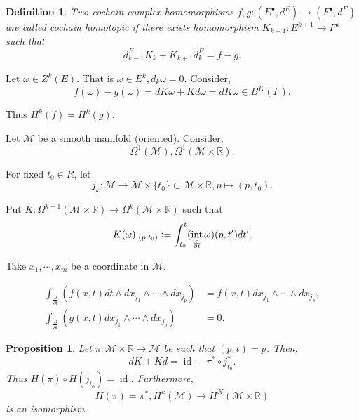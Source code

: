 \documentclass[8pt]{article}
\newtheorem{proposition}{Proposition}[section]
\newtheorem{definition}{Definition}[section]
\DeclareMathOperator{\interior}{int}
\DeclareMathOperator{\id}{id}
\newcommand{\defeq}{\vcentcolon=}
\newcommand{\R}[0]{\mathbb{R}}
\newcommand{\M}[0]{\mathcal{M}}
\newcommand{\pd}[2]{{\frac {\partial #1} {\partial #2}}}
\begin{document}
\begin{definition}
  Two cochain complex homomorphisms $f,g:(E^\bullet,d^E)\to(F^\bullet,d^F)$ are called cochain homotopic if there exists homomorphism $K_{k+1}:E^{k+1}\to F^k$ such that 
  \begin{equation*}
    d^F_{k-1}K_k+K_{k+1}d_k^E = f-g.
  \end{equation*}
\end{definition}

Let $\omega\in Z^k(E)$. That is $\omega\in E^k,d_k\omega = 0$. Consider,
\begin{equation*}
  f(\omega) - g(\omega) = dK\omega + Kd\omega = dK\omega\in B^K(F).
\end{equation*}

Thus $H^k(f)=H^k(g)$. 
\par Let $\M$ be a smooth manifold (oriented). Consider,
\begin{equation*}
  \Omega^1(\M),\Omega^1(\M\times \R). 
\end{equation*}

For fixed $t_0\in R$, let  
\begin{equation*}
  j_k:\M\to \M\times\{t_0\}\subset\M\times\R, p\mapsto (p,t_0).
\end{equation*}

Put $K:\Omega^{k+1}(\M\times\R) \to\Omega^k(\M\times\R)$ such that 
\begin{equation*}
  K(\omega)|_{(p,t_0)}\defeq\int_{t_0}^t (\interior_{\pd{}{t}}\omega)(p,t')dt'.
\end{equation*}

Take $x_1,\cdots,x_m$ be a coordinate in $\M$. 

\begin{align*}
  \int_{\pd{}{t}}(f(x,t)dt\wedge dx_{j_1}\wedge\cdots\wedge dx_{j_p}) & = f(x,t) dx_{j_1}\wedge\cdots\wedge dx_{j_p},\\
  \int_{\pd{}{t}}(g(x,t)dx_{j_1}\wedge\cdots\wedge dx_{j_p}) & = 0.
\end{align*}

\begin{proposition}
  Let $\pi:\M\times\R\to\M$ be such that $(p,t) = p$. Then,
  \begin{equation*}
    dK+Kd = \id-\pi^*\circ j_{t_0}^*.
  \end{equation*}
  Thus $H(\pi)\circ H(j_{t_0}) = \id$. Furthermore,
  \begin{equation*}
    H(\pi)=\pi^*,H^k(\M)\to H^K(\M\times\R)
  \end{equation*}
  is an isomorphism.
\end{proposition}
\end{document}
